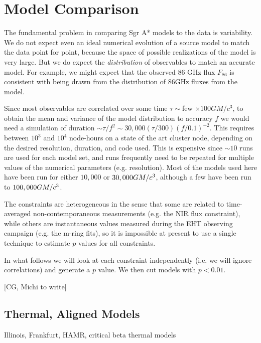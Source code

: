 \section{Model Comparison}\label{sec:comparisons}

The fundamental problem in comparing Sgr A* models to the data is variability.  We do not expect even an ideal numerical evolution of a source model to match the data point for point, because the space of possible realizations of the model is very large.  But we do expect the {\em distribution} of observables to match an accurate model.  For example, we might expect that the observed 86 GHz flux $F_{86}$ is consistent with being drawn from the distribution of 86GHz fluxes from the model.

Since most observables are correlated over some time $\tau \sim $few $\times 100 G M/c^3$, to obtain the mean and variance of the model distribution to accuracy $f$ we would need a simulation of duration $\sim \tau/f^2 \sim 30,000 (\tau/300) (f/0.1)^{-2}$.  This requires between $10^3$ and $10^4$ node-hours on a state of the art cluster node, depending on the desired resolution, duration, and code used.  This is expensive since $\sim 10$ runs are used for each model set, and runs frequently need to be repeated for multiple values of the numerical parameters (e.g. resolution).  Most of the models used here have been run for either $10,000$ or $30,000 GM/c^3$, although a few have been run to $100,000 GM/c^3$.

The constraints are heterogeneous in the sense that some are related to time-averaged non-contemporaneous measurements (e.g. the NIR flux constraint), while others are instantaneous values measured during the EHT observing campaign (e.g. the m-ring fits), so it is impossible at present to use a single technique to estimate $p$ values for all constraints.

In what follows we will look at each constraint independently (i.e. we will ignore correlations) and generate a $p$ value.  We then cut models with $p < 0.01$.

[CG, Michi to write]

\subsection{Thermal, Aligned Models}

Illinois, Frankfurt, HAMR, critical beta thermal models

